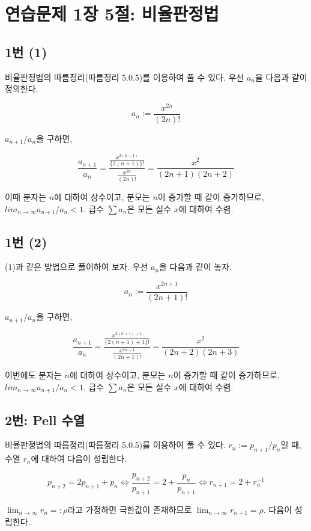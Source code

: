 \section{연습문제 1장 5절: 비율판정법}

\subsection{1번 (1)}

비율판정법의 따름정리(따름정리 5.0.5)를 이용하여 풀 수 있다. 우선 $a_n$을 다음과 같이 정의한다.

\[
a_n:=\frac{x^{2n}}{(2n)!}
\]

$a_{n+1}/a_n$을 구하면,

\[
\frac{a_{n+1}}{a_n}=\frac{\frac{x^{2(n+1)}}{\{2(n+1)\}!}}{\frac{x^{2n}}{(2n)!}}=\frac{x^2}{(2n+1)(2n+2)}
\]

이때 분자는 $n$에 대하여 상수이고, 분모는 $n$이 증가할 때 같이 증가하므로, $lim_{n\to\infty}a_{n+1}/a_n<1$. 급수 $\sum a_n$은 모든 실수 $x$에 대하여 수렴.

\subsection{1번 (2)}

(1)과 같은 방법으로 풀이하여 보자. 우선 $a_n$을 다음과 같이 놓자.

\[
a_n:=\frac{x^{2n+1}}{(2n+1)!}
\]

$a_{n+1}/a_n$을 구하면,

\[
\frac{a_{n+1}}{a_n}=\frac{\frac{x^{2(n+1)+1}}{\{2(n+1)+1\}!}}{\frac{x^{2n+1}}{(2n+1)!}}=\frac{x^2}{(2n+2)(2n+3)}
\]

이번에도 분자는 $n$에 대하여 상수이고, 분모는 $n$이 증가할 때 같이 증가하므로, $lim_{n\to\infty}a_{n+1}/a_n<1$. 급수 $\sum a_n$은 모든 실수 $x$에 대하여 수렴.

\subsection{2번: Pell 수열}

비율판정법의 따름정리(따름정리 5.0.5)를 이용하여 풀 수 있다. $r_n:=p_{n+1}/p_n$일 때, 수열 $r_n$에 대하여 다음이 성립한다.

\[
p_{n+2}=2p_{n+1}+p_n \Longleftrightarrow \frac{p_{n+2}}{p_{n+1}}=2+\frac{p_n}{p_{n+1}} \Longleftrightarrow r_{n+1}=2+r_n^{-1}
\]

$\lim_{n\to\infty}r_n=:\rho$라고 가정하면 극한값이 존재하므로 $\lim_{n\to\infty}r_{n+1}=\rho$. 다음이 성립한다.

